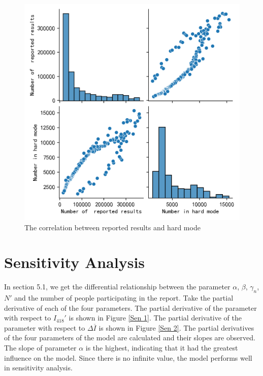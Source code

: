 \documentclass[
  journal=medium,
  manuscript=Report,
  year=2023,
  volume=37,
]{cup-journal}
\begin{document}
\begin{figure}[hbt!]
    \centering
    \includegraphics[width=0.5\linewidth]{pic/Numbers相关性图.png}
    \caption{The correlation between reported results and hard mode}
    \label{two relation}
\end{figure}

\section{Sensitivity Analysis}

In section 5.1, we get the differential relationship between the parameter $\alpha$, $\beta$, $\gamma_n$, $N'$ and the number of people participating in the report. Take the partial derivative of each of the four parameters. The partial derivative of the parameter with respect to $I_{418}'$ is shown in Figure \ref{Sen 1}. The partial derivative of the parameter with respect to $\Delta \overline{I}$ is shown in Figure \ref{Sen 2}. The partial derivatives of the four parameters of the model are calculated and their slopes are observed. The slope of parameter $\alpha$ is the highest, indicating that it had the greatest influence on the model. Since there is no infinite value, the model performs well in sensitivity analysis. 
\end{document}

